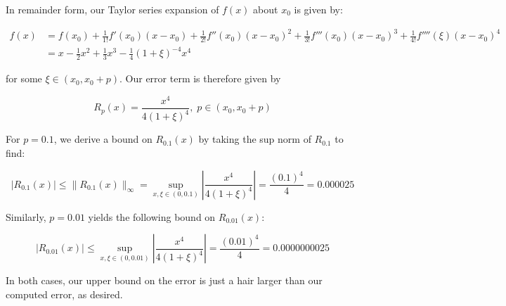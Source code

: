 \begin{solution}
  In remainder form, our Taylor series expansion of $f(x)$ about $x_0$ is given by:

  \begin{align*}
    f(x) &= f(x_0) + \frac{1}{1!} f'(x_0)(x - x_0) + \frac{1}{2!} f''(x_0)(x - x_0)^2 + \frac{1}{3!} f'''(x_0)(x - x_0)^3 + \frac{1}{4!}f''''(\xi)(x - x_0)^4 \\
         &= x - \frac{1}{2} x^2 + \frac{1}{3} x^3 - \frac{1}{4}(1 + \xi)^{-4} x^4
  \end{align*}

  for some $\xi \in (x_0, x_0 + p)$. Our error term is therefore given by

  $$
  R_p(x) = \frac{x^4}{4(1 + \xi)^4}, \; p \in (x_0, x_0 + p)
  $$

  For $p = 0.1$, we derive a bound on $R_{0.1}(x)$ by taking the sup norm of $R_{0.1}$ to find:

  $$
  |R_{0.1}(x)| \le \| R_{0.1}(x) \|_{\infty} = \sup_{x,\xi \in (0, 0.1)}{\left\vert \frac{x^4}{4(1 + \xi)^4} \right\vert} 
                                             = \frac{(0.1)^4}{4} = 0.000025
  $$

  Similarly, $p = 0.01$ yields the following bound on $R_{0.01}(x)$:
  
  $$
  |R_{0.01}(x)| \le \sup_{x,\xi \in (0, 0.01)}{\left\vert \frac{x^4}{4(1 + \xi)^4} \right\vert} 
                  = \frac{(0.01)^4}{4} = 0.0000000025
  $$

  In both cases, our upper bound on the error is just a hair larger than our computed error, as desired. 
  \ \\
\end{solution}